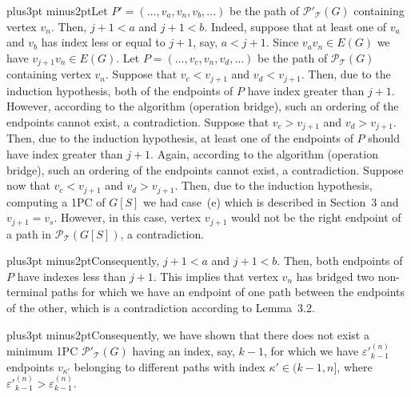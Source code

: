 \documentclass[10pt]{article}
\def\yskip{\penalty-50\vskip3pt plus3pt minus2pt}
\def\y{\yskip}
\begin{document}
{\y Let $P'=(\ldots, v_a, v_n, v_b, \ldots)$ be the path of
$\mathcal{P'_{\mathcal{T}}}(G)$ containing vertex $v_n$. Then,
$j+1<a$ and $j+1<b$. Indeed, suppose that at least one of $v_a$
and $v_b$ has index less or equal to $j+1$, say, $a<j+1$. Since
$v_av_n \in E(G)$ we have $v_{j+1}v_n \in E(G)$. Let $P=(\ldots,
v_c, v_n, v_d, \ldots)$ be the path of
$\mathcal{P_{\mathcal{T}}}(G)$ containing vertex $v_n$. Suppose
that $v_c<v_{j+1}$ and $v_d<v_{j+1}$. Then, due to the induction
hypothesis, both of the endpoints of $P$ have index greater than
$j+1$. However, according to the algorithm (operation bridge),
such an ordering of the endpoints cannot exist, a contradiction.
Suppose that $v_c>v_{j+1}$ and $v_d>v_{j+1}$. Then, due to the
induction hypothesis, at least one of the endpoints of $P$ should
have index greater than $j+1$. Again, according to the algorithm
(operation bridge), such an ordering of the endpoints cannot
exist, a contradiction. Suppose now that $v_c<v_{j+1}$ and
$v_d>v_{j+1}$. Then, due to the induction hypothesis, computing a
1PC of $G[S]$ we had case~(e) which is described in Section~3 and
$v_{j+1}=v_s$. However, in this case, vertex $v_{j+1}$ would not
be the right endpoint of a path in
$\mathcal{P_{\mathcal{T}}}(G[S])$, a contradiction.

\y Consequently, $j+1<a$ and $j+1<b$. Then, both endpoints of $P$
have indexes less than $j+1$. This implies that vertex $v_n$ has
bridged two non-terminal paths for which we have an endpoint of
one path between the endpoints of the other, which is a
contradiction according to Lemma~3.2.

\y Consequently, we have shown that there does not exist a minimum
1PC $\mathcal{P'_{\mathcal{T}}}(G)$ having an index, say, $k-1$,
for which we have $\varepsilon'^{(n)}_{k-1}$ endpoints
$v_{\kappa'}$ belonging to different paths with index $\kappa' \in
(k-1,n]$, where
$\varepsilon'^{(n)}_{k-1}>\varepsilon^{(n)}_{k-1}$.

}
\end{document}
